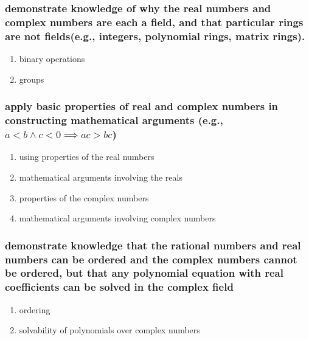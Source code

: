 \documentclass[11pt]{article}
\begin{document}
\subsubsection{demonstrate knowledge of why the real numbers and complex numbers are each a field, and that particular rings are not fields(e.g., integers, polynomial rings, matrix rings).}
\label{sec:orge763002}
\begin{enumerate}
\item binary operations
\label{sec:org0e36787}
\item groups
\label{sec:orga02ad91}
\end{enumerate}
\subsubsection{apply basic properties of real and complex numbers in constructing mathematical arguments (e.g., \(a < b \land c < 0 \implies ac > bc\))}
\label{sec:orgc3308d9}
\begin{enumerate}
\item using properties of the real numbers
\label{sec:org8c6f4f4}
\item mathematical arguments involving the reals
\label{sec:org17fb357}
\item properties of the complex numbers
\label{sec:orgd5c0fe0}
\item mathematical arguments involving complex numbers
\label{sec:orgd20cc79}
\end{enumerate}
\subsubsection{demonstrate knowledge that the rational numbers and real numbers can be ordered and the complex numbers cannot be ordered, but that any polynomial equation with real coefficients can be solved in the complex field}
\label{sec:org7ba389f}
\begin{enumerate}
\item ordering
\label{sec:org46bd2d4}
\item solvability of polynomials over complex numbers
\label{sec:org6b3f214}
\end{enumerate}
\end{document}
